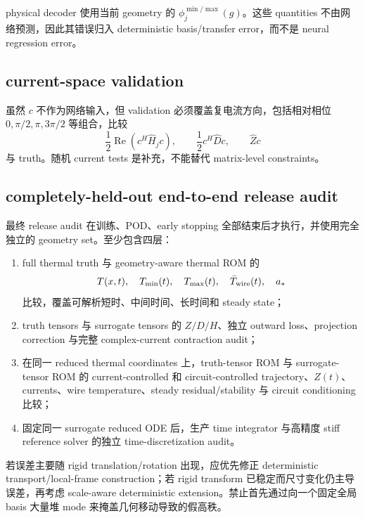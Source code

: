 physical decoder 使用当前 geometry 的 $\phi_j^{\min/\max}(g)$。这些 quantities 不由网络预测，因此其错误归入 deterministic basis/transfer error，而不是 neural regression error。

\subsection{current-space validation}
虽然 $c$ 不作为网络输入，但 validation 必须覆盖复电流方向，包括相对相位 $0,\pi/2,\pi,3\pi/2$ 等组合，比较
\begin{equation}
\frac12\operatorname{Re}(c^H\widehat H_jc),
\qquad
\frac12c^H\widehat Dc,
\qquad
\widehat Zc
\end{equation}
与 truth。随机 current tests 是补充，不能替代 matrix-level constraints。

\subsection{completely-held-out end-to-end release audit}
最终 release audit 在训练、POD、early stopping 全部结束后才执行，并使用完全独立的 geometry set。至少包含四层：
\begin{enumerate}
  \item full thermal truth 与 geometry-aware thermal ROM 的
  \begin{equation}
  T(x,t),\quad T_{\min}(t),\quad T_{\max}(t),\quad \bar T_{\rm wire}(t),\quad a_*
  \end{equation}
  比较，覆盖可解析短时、中间时间、长时间和 steady state；
  \item truth tensors 与 surrogate tensors 的 $Z/D/H$、独立 outward loss、projection correction 与完整 complex-current contraction audit；
  \item 在同一 reduced thermal coordinates 上，truth-tensor ROM 与 surrogate-tensor ROM 的 current-controlled 和 circuit-controlled trajectory、$Z(t)$、currents、wire temperature、steady residual/stability 与 circuit conditioning 比较；
  \item 固定同一 surrogate reduced ODE 后，生产 time integrator 与高精度 stiff reference solver 的独立 time-discretization audit。
\end{enumerate}

若误差主要随 rigid translation/rotation 出现，应优先修正 deterministic transport/local-frame construction；若 rigid transform 已稳定而尺寸变化仍主导误差，再考虑 scale-aware deterministic extension。禁止首先通过向一个固定全局 basis 大量堆 mode 来掩盖几何移动导致的假高秩。

